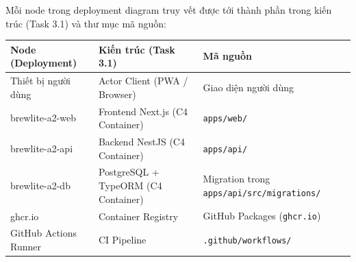 Mỗi node trong deployment diagram truy vết được tới thành phần trong kiến trúc (Task 3.1) và thư mục mã nguồn:

\begin{center}
\begin{tabular}{lll}
\toprule
\textbf{Node (Deployment)} & \textbf{Kiến trúc (Task 3.1)} & \textbf{Mã nguồn} \\
\midrule
Thiết bị người dùng & Actor Client (PWA / Browser) & Giao diện người dùng \\
brewlite-a2-web & Frontend Next.js (C4 Container) & \texttt{apps/web/} \\
brewlite-a2-api & Backend NestJS (C4 Container) & \texttt{apps/api/} \\
brewlite-a2-db  & PostgreSQL + TypeORM (C4 Container) & Migration trong \texttt{apps/api/src/migrations/} \\
ghcr.io      & Container Registry & GitHub Packages (\texttt{ghcr.io}) \\
GitHub Actions Runner & CI Pipeline & \texttt{.github/workflows/} \\
\bottomrule
\end{tabular}
\end{center}
